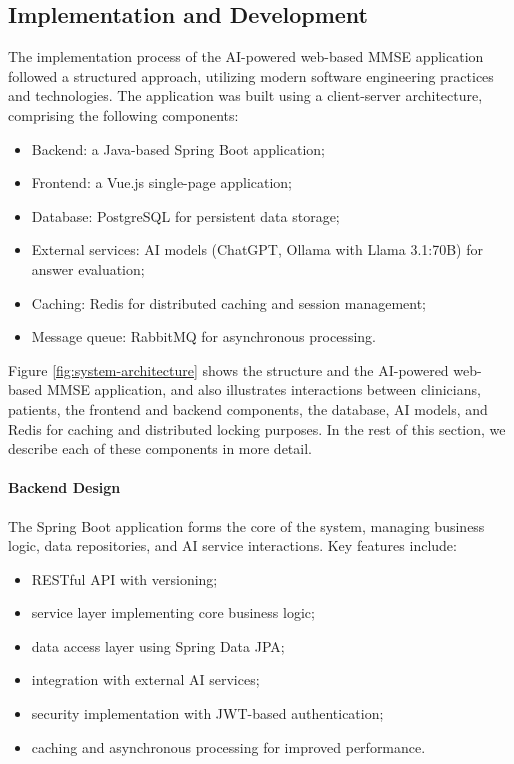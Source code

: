 \subsection{Implementation and Development}

The implementation process of the AI-powered web-based MMSE application followed a structured approach, utilizing modern software engineering practices and technologies. The application was built using a client-server architecture, comprising the following components:
\begin{itemize}
\item Backend: a Java-based Spring Boot application;
\item Frontend: a Vue.js single-page application;
\item Database: PostgreSQL for persistent data storage;
\item External services: AI models (ChatGPT, Ollama with Llama 3.1:70B) for answer evaluation;
\item Caching: Redis for distributed caching and session management;
\item Message queue: RabbitMQ for asynchronous processing.
\end{itemize}

Figure \ref{fig:system-architecture} shows the structure and the AI-powered web-based MMSE application, and also illustrates interactions between clinicians, patients, the frontend and backend components, the database, AI models, and Redis for caching and distributed locking purposes. In the rest of this section, we describe each of these components in more detail.

\paragraph{Backend Design}
The Spring Boot application forms the core of the system, managing business logic, data repositories, and AI service interactions. Key features include:
\begin{itemize}
\item RESTful API with versioning;
\item service layer implementing core business logic;
\item data access layer using Spring Data JPA;
\item integration with external AI services;
\item security implementation with JWT-based authentication;
\item caching and asynchronous processing for improved performance.
\end{itemize}

